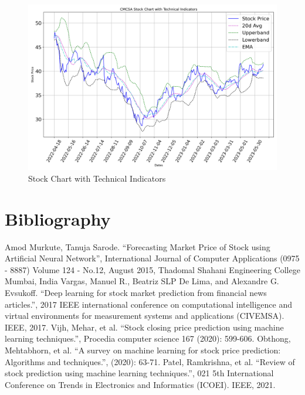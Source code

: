 \documentclass[conference]{IEEEtran}
\begin{document}
\begin{figure}[t]
    \includegraphics[width=\columnwidth]{tech_indicators}
    \caption{Stock Chart with Technical Indicators}
\end{figure}

\section*{Bibliography}

\begin{thebibliography}{00}
 Amod Murkute, Tanuja Sarode. ``Forecasting Market Price of Stock using Artificial Neural Network'', International Journal of Computer Applications (0975 - 8887) Volume 124 - No.12, August 2015, Thadomal Shahani Engineering College Mumbai, India
 Vargas, Manuel R., Beatriz SLP De Lima, and Alexandre G. Evsukoff.  ``Deep learning for stock market prediction from financial news articles.'', 2017 IEEE international conference on computational intelligence and virtual environments for measurement systems and applications (CIVEMSA). IEEE, 2017.
 Vijh, Mehar, et al. ``Stock closing price prediction using machine learning techniques.'', Procedia computer science 167 (2020): 599-606.
 Obthong, Mehtabhorn, et al.  ``A survey on machine learning for stock price prediction: Algorithms and techniques.'', (2020): 63-71.
 Patel, Ramkrishna, et al. ``Review of stock prediction using machine learning techniques.'', 021 5th International Conference on Trends in Electronics and Informatics (ICOEI). IEEE, 2021.
\end{thebibliography}
\vspace{12pt}
\end{document}

